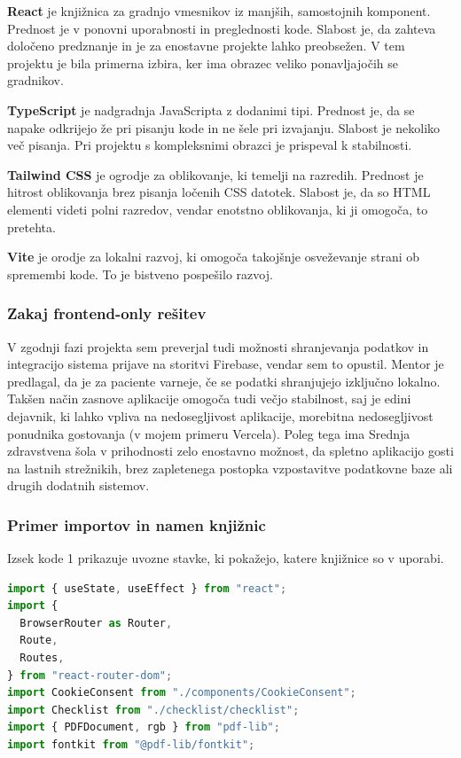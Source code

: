 \documentclass[12pt,a4paper]{article}
\begin{document}
\textbf{React} je knji\v{z}nica za gradnjo vmesnikov iz manj\v{s}ih, samostojnih komponent. Prednost je v ponovni uporabnosti in preglednosti kode. Slabost je, da zahteva dolo\v{c}eno predznanje in je za enostavne projekte lahko preobse\v{z}en. V tem projektu je bila primerna izbira, ker ima obrazec veliko ponavljajo\v{c}ih se gradnikov.

\textbf{TypeScript} je nadgradnja JavaScripta z dodanimi tipi. Prednost je, da se napake odkrijejo \v{z}e pri pisanju kode in ne \v{s}ele pri izvajanju. Slabost je nekoliko ve\v{c} pisanja. Pri projektu s kompleksnimi obrazci je prispeval k stabilnosti.

\textbf{Tailwind CSS} je ogrodje za oblikovanje, ki temelji na razredih. Prednost je hitrost oblikovanja brez pisanja lo\v{c}enih CSS datotek. Slabost je, da so HTML elementi videti polni razredov, vendar enotstno oblikovanja, ki ji omogo\v{c}a, to pretehta.

\textbf{Vite} je orodje za lokalni razvoj, ki omogo\v{c}a takoj\v{s}nje osve\v{z}evanje strani ob spremembi kode. To je bistveno pospe\v{s}ilo razvoj.

\subsubsection{Zakaj frontend-only re\v{s}itev}

V zgodnji fazi projekta sem preverjal tudi mo\v{z}nosti shranjevanja podatkov in integracijo sistema prijave na storitvi Firebase, vendar sem to opustil. Mentor je predlagal, da je za paciente varneje, \v{c}e se podatki shranjujejo izklju\v{c}no lokalno. Tak\v{s}en na\v{c}in zasnove aplikacije omogo\v{c}a tudi ve\v{c}jo stabilnost, saj je edini dejavnik, ki lahko vpliva na nedosegljivost aplikacije, morebitna nedosegljivost ponudnika gostovanja (v mojem primeru Vercela). Poleg tega ima Srednja zdravstvena \v{s}ola v prihodnosti zelo enostavno mo\v{z}nost, da spletno aplikacijo gosti na lastnih stre\v{z}nikih, brez zapletenega postopka vzpostavitve podatkovne baze ali drugih dodatnih sistemov.

\subsubsection{Primer importov in namen knji\v{z}nic}

Izsek kode 1 prikazuje uvozne stavke, ki poka\v{z}ejo, katere knji\v{z}nice so v uporabi.

\begin{lstlisting}[language=JavaScript, caption={Izsek kode 1: Uvozi (importi) v glavni datoteki App.tsx}]
import { useState, useEffect } from "react";
import {
  BrowserRouter as Router,
  Route,
  Routes,
} from "react-router-dom";
import CookieConsent from "./components/CookieConsent";
import Checklist from "./checklist/checklist";
import { PDFDocument, rgb } from "pdf-lib";
import fontkit from "@pdf-lib/fontkit";
\end{lstlisting}
\end{document}
